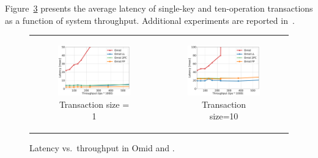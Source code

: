 Figure~\ref{fig:throughput-latency} presents the average latency of single-key and ten-operation transactions as a function of {system} throughput.
Additional experiments are reported in~\cite{OmidVLDB}.  


\begin{figure}[htb]

\centering
\begin{tabular}{cc}

    \begin{subfigure}[t]{0.3\textwidth}
      	\includegraphics[width=\textwidth]{figs/throughputlatency1.pdf}
	    \caption[]{\small Transaction size = 1}
        \label{fig:tl-1}      
   \end{subfigure}  
& 
    \begin{subfigure}[t]{0.3\textwidth}
	\includegraphics[width=\textwidth]{figs/throughputlatency10.pdf}
	\caption[]{\small Transaction size=10}
    \label{fig:tl-10}
  \end{subfigure}  
 \end{tabular} 
 
  \caption{\small Latency vs.\ throughput  in Omid and \sysll.  }
  \vspace{-0.3cm}
  \label{fig:throughput-latency}
\end{figure}



